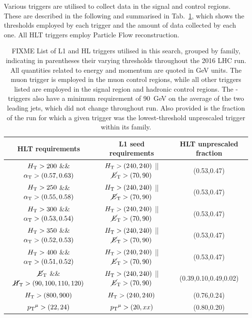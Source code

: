 Various triggers are utilised to collect data in the signal and control 
regions. These are described in the following and summarised in 
Tab.~\ref{tab:triggers}, which shows the thresholds employed by each trigger 
and the amount of data collected by each one. All HLT triggers employ Particle 
Flow reconstruction.

\begin{table}[h]
\footnotesize
\centering
\begin{tabular}{ccc}
\hline
HLT requirements & L1 seed requirements & HLT unprescaled fraction \\
\hline\hline
$\mbox{$H_\text{T}$}>200$ \&\& $\alpha_{\text{T}}>(0.57,0.63)$ & $\mbox{$H_\text{T}$}>(240,240)$ || 
$\mbox{$\cancel{E}_\text{T}$}>(70,90)$ & (0.53,0.47) \\
$\mbox{$H_\text{T}$}>250$ \&\& $\alpha_{\text{T}}>(0.55,0.58)$ & $\mbox{$H_\text{T}$}>(240,240)$ || 
$\mbox{$\cancel{E}_\text{T}$}>(70,90)$ & (0.53,0.47) \\
$\mbox{$H_\text{T}$}>300$ \&\& $\alpha_{\text{T}}>(0.53,0.54)$ & $\mbox{$H_\text{T}$}>(240,240)$ || 
$\mbox{$\cancel{E}_\text{T}$}>(70,90)$ & (0.53,0.47) \\
$\mbox{$H_\text{T}$}>350$ \&\& $\alpha_{\text{T}}>(0.52,0.53)$ & $\mbox{$H_\text{T}$}>(240,240)$ || 
$\mbox{$\cancel{E}_\text{T}$}>(70,90)$ & (0.53,0.47) \\
$\mbox{$H_\text{T}$}>400$ \&\& $\alpha_{\text{T}}>(0.51,0.52)$ & $\mbox{$H_\text{T}$}>(240,240)$ || 
$\mbox{$\cancel{E}_\text{T}$}>(70,90)$ & (0.53,0.47) \\
\hline
$\mbox{$\cancel{E}_\text{T}$}$ \&\& $\mbox{$\cancel{H}_\text{T}$}>(90,100,110,120)$ & $\mbox{$H_\text{T}$}>(240,240)$ || 
$\mbox{$\cancel{E}_\text{T}$}>(70,90)$ & (0.39,0.10,0.49,0.02) \\
\hline
$\mbox{$H_\text{T}$}>(800,900)$ & $\mbox{$H_\text{T}$}>(240,240)$ & (0.76,0.24) \\
\hline
${p_{\text T}}^\mu>(22,24)$ & ${p_{\text T}}^\mu>(20,xx)$ & (0.80,0.20) \\
\hline
\end{tabular}
\caption{FIXME List of L1 and HL triggers utilised in this search, grouped by 
family, 
indicating in parentheses their varying thresholds throughout the 2016 LHC run. 
All quantities related to energy and momentum are quoted in GeV units.
The muon trigger is employed in the muon 
control regions, while all other triggers listed are employed in the signal 
region and hadronic control regions.
The \scalht-\alphat triggers also have a minimum requirement of 90~GeV on the 
average \pt of the two leading jets, which did not change throughout run.
Also provided is the fraction of the run for which a given trigger was the 
lowest-threshold unprescaled trigger within its family.}
\label{tab:triggers}
\end{table}

